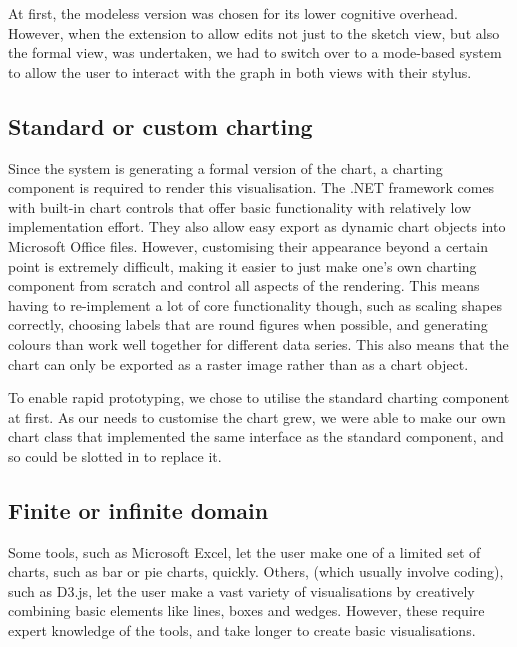 	At first, the modeless version was chosen for its lower cognitive overhead. However, when the extension to allow edits not just to the sketch view, but also the formal view, was undertaken, we had to switch over to a mode-based system to allow the user to interact with the graph in both views with their stylus.
	
	\subsection{Standard or custom charting}	
	Since the system is generating a formal version of the chart, a charting component is required to render this visualisation. The .NET framework comes with built-in chart controls that offer basic functionality with relatively low implementation effort. They also allow easy export as dynamic chart objects into Microsoft Office files. However, customising their appearance beyond a certain point is extremely difficult, making it easier to just make one's own charting component from scratch and control all aspects of the rendering. This means having to re-implement a lot of core functionality though, such as scaling shapes correctly, choosing labels that are round figures when possible, and generating colours than work well together for different data series. This also means that the chart can only be exported as a raster image rather than as a chart object.
	
	To enable rapid prototyping, we chose to utilise the standard charting component at first. As our needs to customise the chart grew, we were able to make our own chart class that implemented the same interface as the standard component, and so could be slotted in to replace it.
	
	\subsection{Finite or infinite domain}
	Some tools, such as Microsoft Excel, let the user make one of a limited set of charts, such as bar or pie charts, quickly. Others, (which usually involve coding), such as D3.js, let the user make a vast variety of visualisations by creatively combining basic elements like lines, boxes and wedges. However, these require expert knowledge of the tools, and take longer to create basic visualisations. 
	
